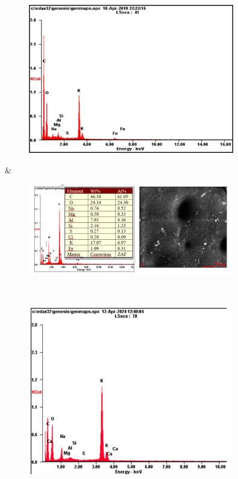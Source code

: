 \begin{figure}[H]
	\centering
	\includegraphics[width=0.8\textwidth]{media/chem2/image89}
	\caption*{}
\end{figure}
 &
\begin{figure}[H]
	\centering
	\includegraphics[width=0.8\textwidth]{media/chem2/image90}
	\caption*{}
\end{figure}
 \\
\begin{figure}[H]
	\centering
	\includegraphics[width=0.8\textwidth]{media/chem2/image91}
	\caption*{}
\end{figure}
